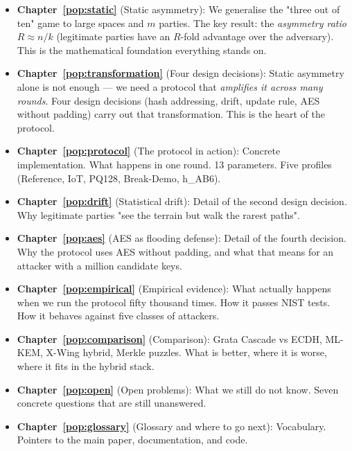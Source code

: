 \documentclass[11pt,a4paper]{article}
\begin{document}
\begin{itemize}[leftmargin=*]
\item \textbf{Chapter~\ref{pop:static}} (Static asymmetry): We generalise the "three out of ten" game to large spaces and $m$ parties. The key result: the \emph{asymmetry ratio} $R \approx n/k$ (legitimate parties have an $R$-fold advantage over the adversary). This is the mathematical foundation everything stands on.

\item \textbf{Chapter~\ref{pop:transformation}} (Four design decisions): Static asymmetry alone is not enough --- we need a protocol that \emph{amplifies it across many rounds}. Four design decisions (hash addressing, drift, update rule, AES without padding) carry out that transformation. This is the heart of the protocol.

\item \textbf{Chapter~\ref{pop:protocol}} (The protocol in action): Concrete implementation. What happens in one round. 13 parameters. Five profiles (Reference, IoT, PQ128, Break-Demo, h\_AB6).

\item \textbf{Chapter~\ref{pop:drift}} (Statistical drift): Detail of the second design decision. Why legitimate parties "see the terrain but walk the rarest paths".

\item \textbf{Chapter~\ref{pop:aes}} (AES as flooding defense): Detail of the fourth decision. Why the protocol uses AES without padding, and what that means for an attacker with a million candidate keys.

\item \textbf{Chapter~\ref{pop:empirical}} (Empirical evidence): What actually happens when we run the protocol fifty thousand times. How it passes NIST tests. How it behaves against five classes of attackers.

\item \textbf{Chapter~\ref{pop:comparison}} (Comparison): Grata Cascade vs ECDH, ML-KEM, X-Wing hybrid, Merkle puzzles. What is better, where it is worse, where it fits in the hybrid stack.

\item \textbf{Chapter~\ref{pop:open}} (Open problems): What we still do not know. Seven concrete questions that are still unanswered.

\item \textbf{Chapter~\ref{pop:glossary}} (Glossary and where to go next): Vocabulary. Pointers to the main paper, documentation, and code.
\end{itemize}
\end{document}
